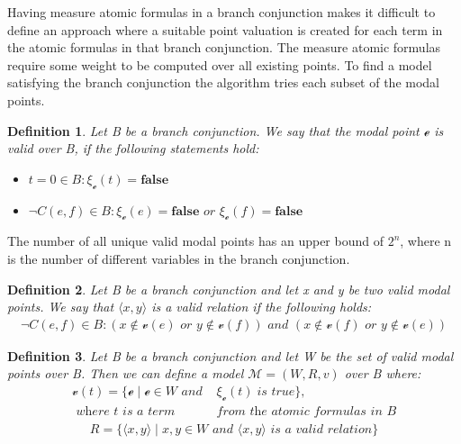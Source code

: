 \documentclass{article}
\newtheorem{defn}{Definition}[section]
\newcommand{\curvedE}{\mathscr{e}}
\newcommand{\vE}{\mathscr{v}}
\newcommand{\vBool}{\xi}
\begin{document}
	Having measure atomic formulas in a branch conjunction makes it difficult to define an approach where a suitable point valuation is created for each term 
	in the atomic formulas in that branch conjunction.
	The measure atomic formulas require some weight to be computed over all existing points. 
	To find a model satisfying the branch conjunction the algorithm tries each subset of the modal points.

	\begin{defn}%
	Let B be a branch conjunction. We say that the modal point $\curvedE$ is valid over B, if the following statements hold:
	\begin{itemize}
		\item $t = 0 \in B:  \vBool_{\curvedE}(t) = \textbf{false}$
		\item $\neg C(e, f) \in B: \vBool_{\curvedE}(e) = \textbf{false} \textit{ or } \vBool_{\curvedE}(f) = \textbf{false}$
	\end{itemize}
	\end{defn}
	The number of all unique valid modal points has an upper bound of $2^n$, where n is the number of different variables in the branch	conjunction.

	\begin{defn}
		Let B be a branch conjunction and let x and y be two valid modal points. We say that $\langle x, y \rangle$ is a valid relation if the following holds:
		\begin{align*}
				\neg C(e, f) \in B: (x \notin \vE(e) \textit{ or } y \notin \vE(f)) \textit{ and } (x \notin \vE(f) \textit{ or } y \notin \vE(e))
		\end{align*}
	\end{defn}

	\begin{defn}%
	Let B be a branch conjunction and let W be the set of valid modal points over B. Then we can define a model $\mathcal{M} = (W, R, v)$ over B where:
		\begin{align*}
				\vE(t) = \{ \curvedE \; | \; \curvedE \in W \textit{ and } &\vBool_{\curvedE}(t) \; \textit{is true} \}, \\
				\textit{ where t is a term } & \textit{from the atomic formulas in B}
		\end{align*}
		\begin{align*}
				R = \{ \langle x, y \rangle\; | \; x, y \in W \textit{ and } \langle x, y \rangle \textit{ is a valid relation}\}
		\end{align*}
	\end{defn}
\end{document}

